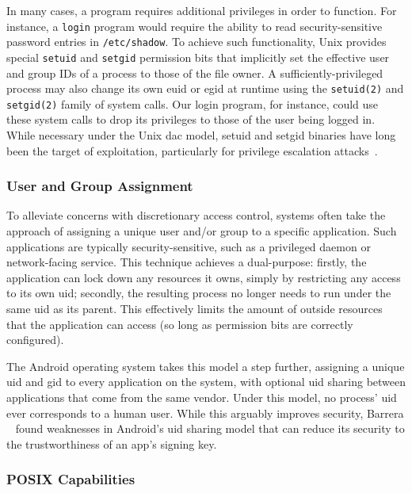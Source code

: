 In many cases, a program requires additional privileges in order to function. For
instance, a \texttt{login} program would require the ability to read security-sensitive
password entries in \texttt{/etc/shadow}. To achieve such functionality, Unix provides
special \texttt{setuid} and \texttt{setgid} permission bits that implicitly set the
effective user and group IDs of a process to those of the file owner.
A sufficiently-privileged process may also change its own \gls{euid} or \gls{egid} at
runtime using the \texttt{setuid(2)} and \texttt{setgid(2)} family of system calls. Our
login program, for instance, could use these system calls to drop its privileges to those
of the user being logged in. While necessary under the Unix \gls{dac} model, setuid and
setgid binaries have long been the target of exploitation, particularly for privilege
escalation attacks~\cite{dittmer2014_setuid, van_oorschot2020_tools_jewels,
jaeger2008_os_security}.

\subsubsection*{User and Group Assignment}

To alleviate concerns with discretionary access control, systems often take the approach
of assigning a unique user and/or group to a specific application. Such applications are
typically security-sensitive, such as a privileged daemon or network-facing service. This
technique achieves a dual-purpose: firstly, the application can lock down any resources it
owns, simply by restricting any access to its own \gls{uid}; secondly, the resulting
process no longer needs to run under the same \gls{uid} as its parent. This effectively
limits the amount of outside resources that the application can access (so long as
permission bits are correctly configured).

The Android operating system takes this model a step further, assigning a unique \gls{uid}
and \gls{gid} to every application on the system, with optional \gls{uid} sharing between
applications that come from the same vendor. Under this model, no process' \gls{uid} ever
corresponds to a human user. While this arguably improves security, Barrera
\etal~\cite{barrera2012_android} found weaknesses in Android's \gls{uid} sharing model
that can reduce its security to the trustworthiness of an app's signing key.

\subsubsection*{POSIX Capabilities}

